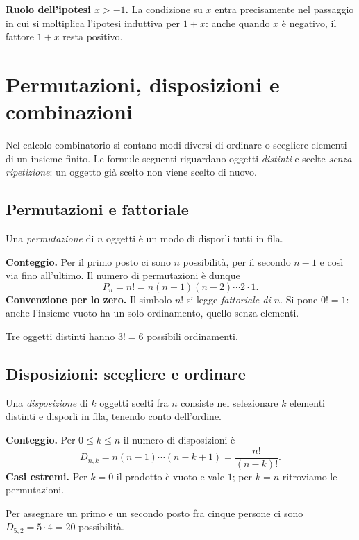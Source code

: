 \textbf{Ruolo dell’ipotesi $x>-1$.} La condizione su $x$ entra precisamente nel passaggio in cui si moltiplica l'ipotesi induttiva per $1+x$: anche quando $x$ è negativo, il fattore $1+x$ resta positivo.

\section{Permutazioni, disposizioni e combinazioni}

Nel calcolo combinatorio si contano modi diversi di ordinare o scegliere elementi di un insieme finito. Le formule seguenti riguardano oggetti \emph{distinti} e scelte \emph{senza ripetizione}: un oggetto già scelto non viene scelto di nuovo.

\subsection{Permutazioni e fattoriale}

Una \emph{permutazione} di $n$ oggetti è un modo di disporli tutti in fila.

\textbf{Conteggio.} Per il primo posto ci sono $n$ possibilità, per il secondo $n-1$ e così via fino all'ultimo. Il numero di permutazioni è dunque
\[
  P_n=n!=n(n-1)(n-2)\cdots2\cdot1.
\]
\textbf{Convenzione per lo zero.} Il simbolo $n!$ si legge \emph{fattoriale di $n$}. Si pone $0!=1$: anche l'insieme vuoto ha un solo ordinamento, quello senza elementi.

\begin{esempio}
Tre oggetti distinti hanno $3!=6$ possibili ordinamenti.
\end{esempio}

\subsection{Disposizioni: scegliere e ordinare}

Una \emph{disposizione} di $k$ oggetti scelti fra $n$ consiste nel selezionare $k$ elementi distinti e disporli in fila, tenendo conto dell'ordine.

\textbf{Conteggio.} Per $0\le k\le n$ il numero di disposizioni è
\[
  D_{n,k}=n(n-1)\cdots(n-k+1)=\frac{n!}{(n-k)!}.
\]
\textbf{Casi estremi.} Per $k=0$ il prodotto è vuoto e vale $1$; per $k=n$ ritroviamo le permutazioni.

\begin{esempio}
Per assegnare un primo e un secondo posto fra cinque persone ci sono $D_{5,2}=5\cdot4=20$ possibilità.
\end{esempio}

